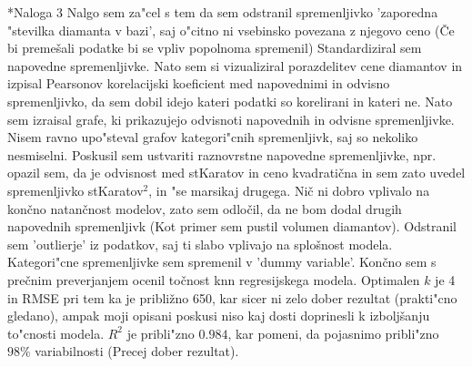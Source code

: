 \documentclass[a4paper, 10pt]{article}
\begin{document}
\begin{subsection}*{Naloga 3}
    Nalgo sem za"cel s tem da sem odstranil spremenljivko 'zaporedna "stevilka diamanta v bazi', saj 
    o"citno ni vsebinsko povezana z njegovo ceno (Če bi premešali podatke bi se vpliv popolnoma spremenil)
    Standardiziral sem napovedne spremenljivke. Nato sem si vizualiziral porazdelitev cene diamantov in izpisal 
    Pearsonov korelacijski koeficient med napovednimi in odvisno spremenljivko, da sem dobil idejo kateri podatki 
    so korelirani in kateri ne.
    Nato sem izraisal grafe, ki prikazujejo odvisnoti napovednih in odvisne spremenljivke. Nisem ravno upo"steval grafov kategori"cnih spremenljivk, saj so nekoliko nesmiselni. Poskusil sem ustvariti raznovrstne napovedne spremenljivke, npr. opazil
    sem, da je odvisnost med stKaratov in ceno kvadratična in sem zato uvedel spremenljivko stKaratov$^2$, in "se marsikaj drugega.
    Nič ni dobro vplivalo na končno natančnost modelov, zato sem odločil, da ne bom dodal drugih napovednih 
    spremenljivk (Kot primer sem pustil volumen diamantov).
    Odstranil sem 'outlierje' iz podatkov, saj ti slabo vplivajo na splošnost modela.
    Kategori"cne spremenljivke sem spremenil v 'dummy variable'. Končno sem s 
    prečnim preverjanjem ocenil točnost knn regresijskega modela.
    Optimalen $k$ je 4 in RMSE pri tem ka je približno 650, kar sicer ni zelo dober rezultat (prakti"cno gledano), ampak moji opisani poskusi
    niso kaj dosti doprinesli k izboljšanju to"cnosti modela. $R^2$ je pribli"zno $0.984$, kar pomeni, da pojasnimo pribli"zno $98\%$ variabilnosti (Precej dober rezultat).
\end{subsection}
\end{document}
